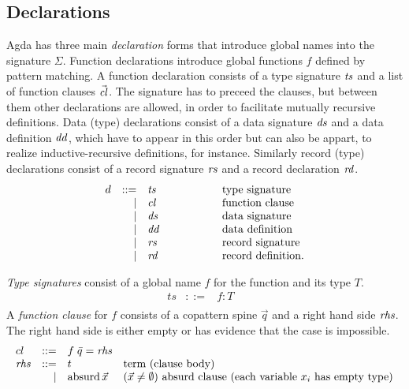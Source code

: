 \documentclass[acmlarge,fleqn]{acmart}\settopmatter{}
\begin{document}
\subsection{Declarations}
\label{sec:declarations}

Agda has three main \emph{declaration} forms that introduce global names into
the signature $\Sigma$.  Function declarations introduce global
functions $f$ defined by pattern matching.  A function declaration
consists of a type signature $\mathit{ts}$ and a list of function clauses
$\vec{\mathit{cl}}$.  The signature has to preceed the clauses, but between
them other declarations are allowed, in order to facilitate mutually
recursive definitions.  Data (type) declarations consist of a data
signature $\mathit{ds}$ and a data definition $\mathit{dd}$, which have to appear in
this order but can also be appart, to realize inductive-recursive
definitions, for instance.  Similarly record (type) declarations
consist of a record signature $\mathit{rs}$ and a record declaration $\mathit{rd}$.
\[
\begin{array}{lrl@{\hspace{2cm}}l}
d  & ::=  & \mathit{ts} & \mbox{type signature}
\\ & \mid & \mathit{cl} & \mbox{function clause}
\\ & \mid & \mathit{ds} & \mbox{data signature}
\\ & \mid & \mathit{dd} & \mbox{data definition}
\\ & \mid & \mathit{rs} & \mbox{record signature}
\\ & \mid & \mathit{rd} & \mbox{record definition}.
\end{array}
 \]

\emph{Type signatures} consist of a global name $f$ for the function and its type $T$.
\[\begin{array}{lrll}
ts &::=& f : T &\\
\end{array} \]
A \emph{function clause} for $f$ consists of a copattern spine $\vec q$ and a right hand side $\mathit{rhs}$.
The right hand side is either empty or has evidence that the case is impossible.
\[
\begin{array}{lrll}
cl &::=& f\; \bar{q} = \mathit{rhs}  &\\
\mathit{rhs} & ::= & t & \text{term (clause body)}\\
      & \mid& \text{absurd}\,\vec x  & (\vec x \not=\emptyset)
      \text{ absurd clause (each variable $x_i$ has empty type)} \\
\end{array}
\]
\end{document}

